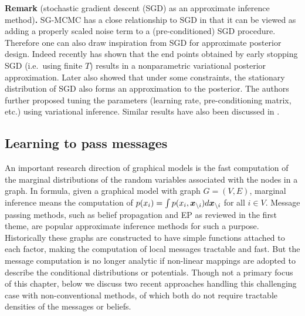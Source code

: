 \vspace{1em}
\begin{tcolorbox}
\textbf{Remark} (stochastic gradient descent (SGD) as an approximate inference method)\textbf{.}
SG-MCMC has a close relationship to SGD in that it can be viewed as adding a properly scaled noise term to a (pre-conditioned) SGD procedure. Therefore one can also draw inspiration from SGD for approximate posterior design. Indeed recently \cite{maclaurin:sgd2016} has shown that the end points obtained by early stopping SGD (i.e.~using finite $T$) results in a nonparametric variational posterior approximation. Later \cite{mandt:sgd2016, mandt:sgd2017} also showed that under some constraints, the stationary distribution of SGD also forms an approximation to the posterior. The authors further proposed tuning the parameters (learning rate, pre-conditioning matrix, etc.) using variational inference. Similar results have also been discussed in \citet{smith:sgd2018}.
\end{tcolorbox}
%

\subsection{Learning to pass messages}

An important research direction of graphical models is the fast computation of the marginal distributions of the random variables associated with the nodes in a graph. In formula, given a graphical model with graph $G = (V, E)$, marginal inference means the computation of $p(x_i) = \int p(x_i, \bm{x}_{\backslash i}) d \bm{x}_{\backslash i}$ for all $i \in V$.
%
Message passing methods, such as belief propagation and EP as reviewed in the first theme, are popular approximate inference methods for such a purpose. Historically these graphs are constructed to have simple functions attached to each factor, making the computation of local messages tractable and fast. But the message computation is no longer analytic if non-linear mappings are adopted to describe the conditional distributions or potentials. Though not a primary focus of this chapter, below we discuss two recent approaches handling this challenging case with non-conventional methods, of which both do not require tractable densities of the messages or beliefs.

